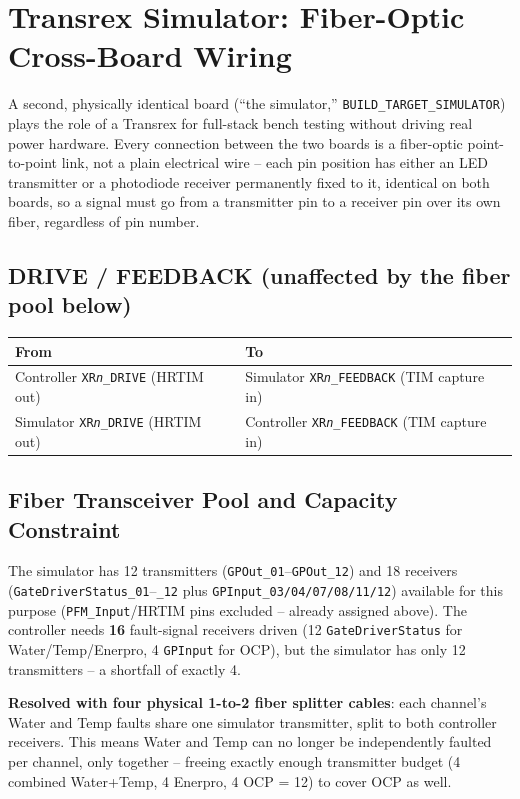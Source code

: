 \documentclass[11pt]{article}
\newcommand{\code}[1]{\texttt{#1}}
\begin{document}
\section{Transrex Simulator: Fiber-Optic Cross-Board Wiring}
\label{sec:simulator-wiring}

A second, physically identical board (``the simulator,''
\code{BUILD\_TARGET\_SIMULATOR}) plays the role of a Transrex for
full-stack bench testing without driving real power hardware. Every
connection between the two boards is a fiber-optic point-to-point
link, not a plain electrical wire -- each pin position has either an
LED transmitter or a photodiode receiver permanently fixed to it,
identical on both boards, so a signal must go from a transmitter pin
to a receiver pin over its own fiber, regardless of pin number.

\subsection{DRIVE / FEEDBACK (unaffected by the fiber pool below)}

\begin{center}
\begin{tabular}{p{2.2in} p{2.2in}}
  \hline
  \textbf{From} & \textbf{To} \\
  \hline
  Controller \code{XR\emph{n}\_DRIVE} (HRTIM out) & Simulator
    \code{XR\emph{n}\_FEEDBACK} (TIM capture in) \\
  Simulator \code{XR\emph{n}\_DRIVE} (HRTIM out) & Controller
    \code{XR\emph{n}\_FEEDBACK} (TIM capture in) \\
  \hline
\end{tabular}
\end{center}

\subsection{Fiber Transceiver Pool and Capacity Constraint}

The simulator has 12 transmitters (\code{GPOut\_01}--\code{GPOut\_12})
and 18 receivers (\code{GateDriverStatus\_01}--\code{\_12} plus
\code{GPInput\_03/04/07/08/11/12}) available for this purpose
(\code{PFM\_Input}/HRTIM pins excluded -- already assigned above). The
controller needs \textbf{16} fault-signal receivers driven (12
\code{GateDriverStatus} for Water/Temp/Enerpro, 4 \code{GPInput} for
OCP), but the simulator has only 12 transmitters -- a shortfall of
exactly 4.

\textbf{Resolved with four physical 1-to-2 fiber splitter cables}: each
channel's Water and Temp faults share one simulator transmitter, split
to both controller receivers. This means Water and Temp can no longer
be independently faulted per channel, only together -- freeing exactly
enough transmitter budget (4 combined Water+Temp, 4 Enerpro, 4 OCP =
12) to cover OCP as well.
\end{document}
